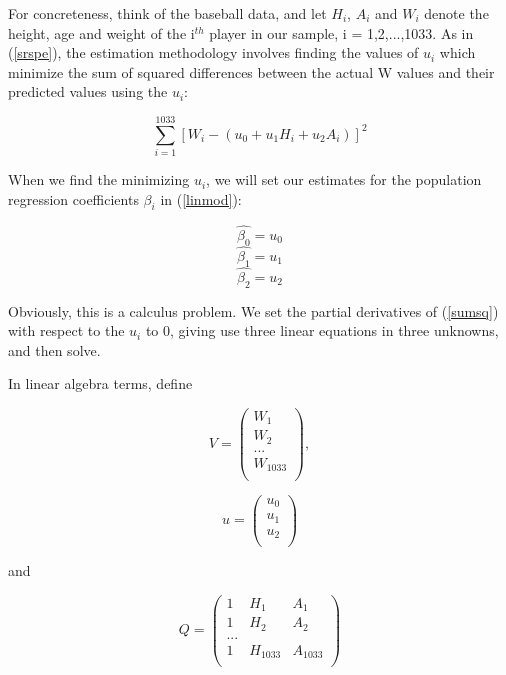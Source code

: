 For concreteness, think of the baseball data, and let $H_i$, $A_i$ and
$W_i$ denote the height, age and weight of the i$^{th}$ player in our
sample, i = 1,2,...,1033.  As in (\ref{srspe}), the estimation
methodology involves finding the values of $u_i$ which
minimize the sum of squared differences between the actual W values and
their predicted values using the $u_i$:

\begin{equation}
\label{sumsq}
\sum_{i=1}^{1033} [W_i - (u_0 + u_1 H_i + 
u_2 A_i)]^2 
\end{equation}

When we find the minimizing $u_i$, we will set our estimates for the
population regression coefficients $\beta_i$ in (\ref{linmod}):

\begin{equation}
\widehat{\beta_0} = u_0
\end{equation}
\begin{equation}
\widehat{\beta_1} = u_1
\end{equation}
\begin{equation}
\widehat{\beta_2} = u_2
\end{equation}

Obviously, this is a calculus problem.  We set the partial derivatives of
(\ref{sumsq}) with respect to the $u_i$ to 0, giving use three
linear equations in three unknowns, and then solve.

In linear algebra terms, define

\begin{equation}
V =
\left (
\begin{array}{l}
W_1 \\
W_2 \\
... \\
W_{1033}\\
\end{array}
\right ),
\end{equation}

\begin{equation}
u = 
\left (
\begin{array}{r}
u_0 \\
u_1 \\
u_2 \\
\end{array}
\right )
\end{equation}

and

\begin{equation}
Q =
\left (
\begin{array}{lll}
1 & H_1 & A_1 \\
1 & H_2 & A_2 \\
... \\
1 & H_{1033} & A_{1033} \\
\end{array}
\right )
\end{equation}

